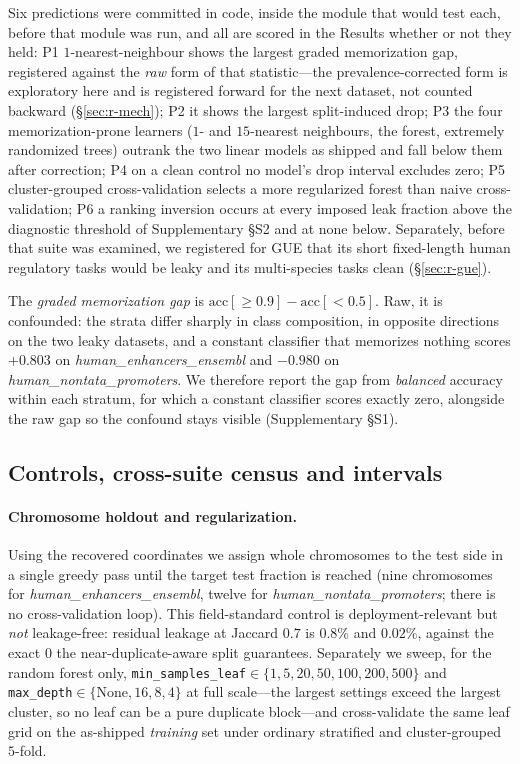 \documentclass[webpdf,modern,large,namedate]{oup-authoring-template}%
\begin{document}
Six predictions were committed in code, inside the module that would test each, before that module was run, and all are scored in the Results whether or not they held: P1 $1$-nearest-neighbour shows the largest graded memorization gap, registered against the \emph{raw} form of that statistic---the prevalence-corrected form is exploratory here and is registered forward for the next dataset, not counted backward (\S\ref{sec:r-mech}); P2 it shows the largest split-induced drop; P3 the four memorization-prone learners ($1$- and $15$-nearest neighbours, the forest, extremely randomized trees) outrank the two linear models as shipped and fall below them after correction; P4 on a clean control no model's drop interval excludes zero; P5 cluster-grouped cross-validation selects a more regularized forest than naive cross-validation; P6 a ranking inversion occurs at every imposed leak fraction above the diagnostic threshold of Supplementary \S S2 and at none below. Separately, before that suite was examined, we registered for GUE \citep{zhou2023dnabert2} that its short fixed-length human regulatory tasks would be leaky and its multi-species tasks clean (\S\ref{sec:r-gue}).

The \emph{graded memorization gap} is $\mathrm{acc}[\ge0.9]-\mathrm{acc}[<0.5]$. Raw, it is confounded: the strata differ sharply in class composition, in opposite directions on the two leaky datasets, and a constant classifier that memorizes nothing scores $+0.803$ on \textit{human\_enhancers\_ensembl} and $-0.980$ on \textit{human\_nontata\_promoters}. We therefore report the gap from \emph{balanced} accuracy within each stratum, for which a constant classifier scores exactly zero, alongside the raw gap so the confound stays visible (Supplementary \S S1).

\subsection{Controls, cross-suite census and intervals}\label{sec:m-controls}
\paragraph{Chromosome holdout and regularization.} Using the recovered coordinates we assign whole chromosomes to the test side in a single greedy pass until the target test fraction is reached (nine chromosomes for \textit{human\_enhancers\_ensembl}, twelve for \textit{human\_nontata\_promoters}; there is no cross-validation loop). This field-standard control is deployment-relevant but \emph{not} leakage-free: residual leakage at Jaccard $0.7$ is $0.8\%$ and $0.02\%$, against the exact $0$ the near-duplicate-aware split guarantees. Separately we sweep, for the random forest only, \texttt{min\_samples\_leaf}$\in\{1,5,20,50,100,200,500\}$ and \texttt{max\_depth}$\in\{\text{None},16,8,4\}$ at full scale---the largest settings exceed the largest cluster, so no leaf can be a pure duplicate block---and cross-validate the same leaf grid on the as-shipped \emph{training} set under ordinary stratified and cluster-grouped $5$-fold.
\end{document}
